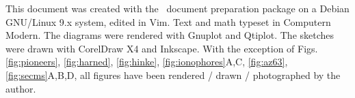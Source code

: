 \newpage
This document was created with the \LaTeXe \, document preparation package on a Debian GNU/Linux 9.x system, edited in Vim. Text and math typeset in Computern Modern.
The diagrams were rendered with Gnuplot and Qtiplot.
The sketches were drawn with CorelDraw X4 and Inkscape.
With the exception of Figs. \ref{fig:pioneers}, \ref{fig:harned}, \ref{fig:hinke}, \ref{fig:ionophores}A,C, \ref{fig:az63}, \ref{fig:secms}A,B,D, all figures have been rendered / drawn / photographed by the author.
